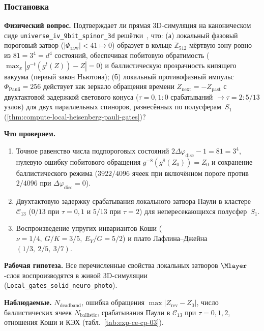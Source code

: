 \label{exp:cecp03}

\subsubsection*{Постановка}
{\sloppy\textbf{Физический вопрос.}
Подтверждает ли прямая 3D-симуляция на каноническом сиде \texttt{universe\_iv\_9bit\_spinor\_3d} решётки~\latGCKshort, что: (а) локальный фазовый пороговый затвор ($|\Phi_{\mathrm{raw}}| < 41 \mapsto 0$) образует в кольце $\mathbb{Z}_{512}$ мёртвую зону ровно из $81 = 3^4 = d^4$ состояний, обеспечивая побитовую обратимость ($\max_x |g^{-t}(g^t(Z)) - Z| = 0$) и баллистическую прозрачность кипящего вакуума (первый закон Ньютона); (б) локальный противофазный импульс $\Phi_{\mathrm{Pauli}} = 256$ действует как зеркало обращения времени $Z_{\mathrm{next}} = -Z_{\mathrm{past}}$ с двухтактовой задержкой светового конуса ($\tau=0,1\colon 0$ срабатываний $\longrightarrow \tau=2\colon 5/13$ узлов) для двух параллельных спиноров, разнесённых по полусферам~$S_1$ (\cref{thm:compute-local-heisenberg-pauli-gates})?\par}

\textbf{Что проверяем.}
\begin{enumerate}[label=\textbf{(\alph*)},leftmargin=*,itemsep=0.25em]
\item Точное равенство числа подпороговых состояний $2\Delta\varphi_{\mathrm{disc}} - 1 = 81 = 3^4$, нулевую ошибку побитового обращения $g^{-8}(g^8(Z_0)) = Z_0$ и сохранение баллистического режима ($3922/4096$ ячеек при включённом пороге против $2/4096$ при $\Delta\varphi_{\mathrm{disc}}=0$).
\item Двухтактовую задержку срабатывания локального затвора Паули в кластере~$\mathcal{C}_{13}$ ($0/13$ при $\tau=0,1$ и $5/13$ при $\tau=2$) для непересекающихся полусфер~$S_1$.
\item Воспроизведение упругих инвариантов Коши ($\nu = 1/4,\ G/K = 3/5,\ E_Y/G = 5/2$) и плато Лафлина--Джейна $(1/3,\ 2/5,\ 3/7)$.
\end{enumerate}

{\sloppy\textbf{Рабочая гипотеза.}
Все перечисленные свойства локальных затворов $\Mlayer$-слоя воспроизводятся в живой 3D-симуляции (\texttt{Local\_gates\_solid\_neuro\_photo}).\par}

\textbf{Наблюдаемые.}
$N_{\mathrm{deadband}}$, ошибка обращения $\max |Z_{\mathrm{rev}} - Z_0|$, число баллистических ячеек $N_{\mathrm{ballistic}}$, срабатывания Паули в $\mathcal{C}_{13}$ при $\tau=0,1,2$, отношения Коши и КЭХ (табл.~\ref{tab:exp-ce-cp-03}).

